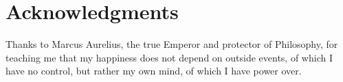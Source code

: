 \section*{Acknowledgments} %


Thanks to Marcus Aurelius, the true Emperor and protector of Philosophy, for teaching me that my happiness does not depend on outside events, of which I have no control, but rather my own mind, of which I have power over.
